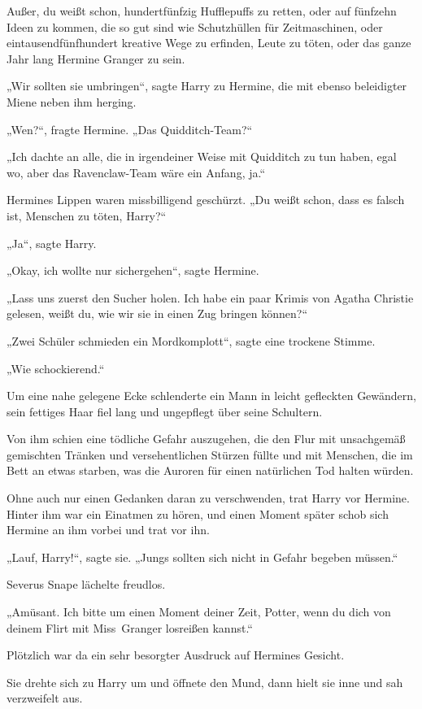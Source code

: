 {Außer, du weißt schon, hundertfünfzig Hufflepuffs zu retten, oder auf fünfzehn Ideen zu kommen, die so gut sind wie Schutzhüllen für Zeitmaschinen, oder eintausendfünfhundert kreative Wege zu erfinden, Leute zu töten, oder das ganze Jahr lang Hermine Granger zu sein.

„Wir sollten sie umbringen“, sagte Harry zu Hermine, die mit ebenso beleidigter Miene neben ihm herging.

„Wen?“, fragte Hermine. „Das Quidditch-Team?“

„Ich dachte an alle, die in irgendeiner Weise mit Quidditch zu tun haben, egal wo, aber das Ravenclaw-Team wäre ein Anfang, ja.“

Hermines Lippen waren missbilligend geschürzt. „Du weißt schon, dass es falsch ist, Menschen zu töten, Harry?“

„Ja“, sagte Harry.

„Okay, ich wollte nur sichergehen“, sagte Hermine.

„Lass uns zuerst den Sucher holen. Ich habe ein paar Krimis von Agatha Christie gelesen, weißt du, wie wir sie in einen Zug bringen können?“

„Zwei Schüler schmieden ein Mordkomplott“, sagte eine trockene Stimme.

„Wie schockierend.“

Um eine nahe gelegene Ecke schlenderte ein Mann in leicht gefleckten Gewändern, sein fettiges Haar fiel lang und ungepflegt über seine Schultern.

Von ihm schien eine tödliche Gefahr auszugehen, die den Flur mit unsachgemäß gemischten Tränken und versehentlichen Stürzen füllte und mit Menschen, die im Bett an etwas starben, was die Auroren für einen natürlichen Tod halten würden.

Ohne auch nur einen Gedanken daran zu verschwenden, trat Harry vor Hermine. Hinter ihm war ein Einatmen zu hören, und einen Moment später schob sich Hermine an ihm vorbei und trat vor ihn.

„Lauf, Harry!“, sagte sie. „Jungs sollten sich nicht in Gefahr begeben müssen.“

Severus Snape lächelte freudlos.

„Amüsant. Ich bitte um einen Moment deiner Zeit, Potter, wenn du dich von deinem Flirt mit Miss~Granger losreißen kannst.“

Plötzlich war da ein sehr besorgter Ausdruck auf Hermines Gesicht.

Sie drehte sich zu Harry um und öffnete den Mund, dann hielt sie inne und sah verzweifelt aus.

}

